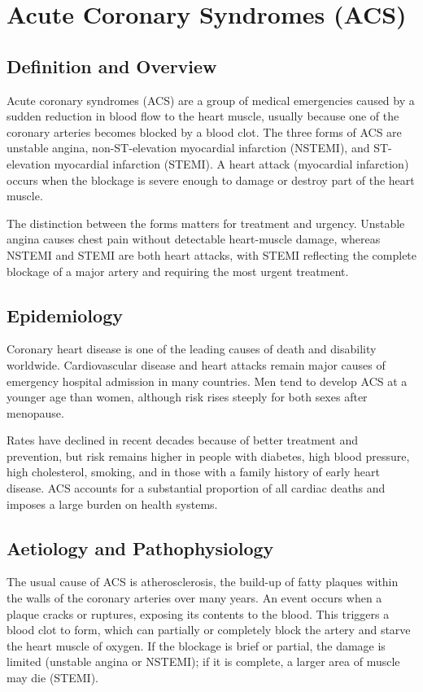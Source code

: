 \chapter{Acute Coronary Syndromes (ACS)}

\section*{Definition and Overview}
Acute coronary syndromes (ACS) are a group of medical emergencies caused by a sudden reduction in blood flow to the heart muscle, usually because one of the coronary arteries becomes blocked by a blood clot. The three forms of ACS are unstable angina, non-ST-elevation myocardial infarction (NSTEMI), and ST-elevation myocardial infarction (STEMI). A heart attack (myocardial infarction) occurs when the blockage is severe enough to damage or destroy part of the heart muscle.

The distinction between the forms matters for treatment and urgency. Unstable angina causes chest pain without detectable heart-muscle damage, whereas NSTEMI and STEMI are both heart attacks, with STEMI reflecting the complete blockage of a major artery and requiring the most urgent treatment.

\section*{Epidemiology}
Coronary heart disease is one of the leading causes of death and disability worldwide. Cardiovascular disease and heart attacks remain major causes of emergency hospital admission in many countries. Men tend to develop ACS at a younger age than women, although risk rises steeply for both sexes after menopause.

Rates have declined in recent decades because of better treatment and prevention, but risk remains higher in people with diabetes, high blood pressure, high cholesterol, smoking, and in those with a family history of early heart disease. ACS accounts for a substantial proportion of all cardiac deaths and imposes a large burden on health systems.

\section*{Aetiology and Pathophysiology}
The usual cause of ACS is atherosclerosis, the build-up of fatty plaques within the walls of the coronary arteries over many years. An event occurs when a plaque cracks or ruptures, exposing its contents to the blood. This triggers a blood clot to form, which can partially or completely block the artery and starve the heart muscle of oxygen. If the blockage is brief or partial, the damage is limited (unstable angina or NSTEMI); if it is complete, a larger area of muscle may die (STEMI).

